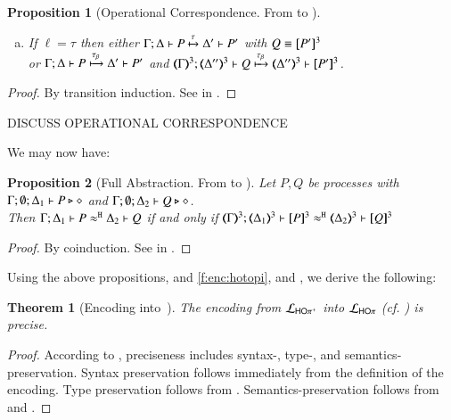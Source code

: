 \documentclass[preprint,11pt]{elsarticle}
\newtheorem{proposition}{Proposition}[section]
\newtheorem{theorem}{Theorem}[section]
\begin{document}
{{\begin{proposition}[Operational Correspondence. From \HOpp to \HOp]
\begin{enumerate}
\begin{enumerate}[a)]
				\item	If $\ell = \tau$ then
					either
					$\Gamma; \Delta \vdash P \xmapsto{\tau} \Delta' \vdash P'$ with $Q \equiv [\!\![P']\!\!]^3$\\
					or
					$\Gamma; \Delta \vdash P \xmapsto{\tau_{\beta}} \Delta' \vdash P'$ and
					$\horel{\tmap{\Gamma}{3}}{\tmap{\Delta''}{3}}{Q}{\hby{\btau}}
					{\tmap{\Delta''}{3}}{\pmap{P'}{3}}$.
			\end{enumerate}
	\end{enumerate}
\end{proposition}

\begin{proof}
	By transition induction.
	See  in .
	\end{proof}

DISCUSS OPERATIONAL CORRESPONDENCE

We may now have:

\begin{proposition}[Full Abstraction. From \HOpp to \HOp]%
	\label{prop:fulla_HOpp_to_HOp}
	Let $P, Q$ be \HOpp processes with $\Gamma; \emptyset; \Delta_1 \vdash P \triangleright \diamond$ and 
	$\Gamma; \emptyset; \Delta_2 \vdash Q \triangleright \diamond$. \\
	Then 
	$\Gamma; \Delta_1 \vdash P \approx^\mathtt{H} \Delta_2 \vdash Q$ if and only if $\horel{\tmap{\Gamma}{3}}{\tmap{\Delta_1}{3}}{\pmap{P}{3}}{\hwb}{\tmap{\Delta_2}{3}}{\pmap{Q}{3}}$
\end{proposition}

\begin{proof}
	By coinduction.
	See  in .
	\end{proof}



Using the above propositions,  
and 
\ref{f:enc:hotopi},
and , 
we derive the following: %


\begin{theorem}[Encoding \HOpp into~\HOp]
	\label{f:enc:hoppptohop}
	The encoding from $\mathcal{L}_{\mathsf{HO\pi^{+}}}$ into $\mathcal{L}_{\mathsf{HO}\pi}$ (cf. )
	is precise. 
\end{theorem}

\begin{proof}
According to , preciseness includes syntax-, type-, and semantics-preservation. 
Syntax preservation follows immediately from the definition of the encoding. 
Type preservation follows from 
.
Semantics-preservation follows from 	
 and 
.
\end{proof}

}}
\end{document}
